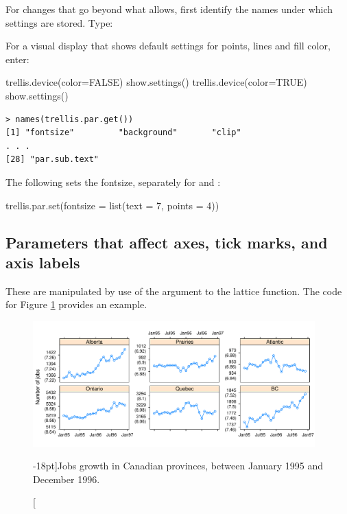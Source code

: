 For changes that go beyond what  allows, first
identify the names under which settings are stored. Type:
\begin{marginfigure}
For a visual display that shows default settings for
  points, lines and fill color, enter:
\begin{Schunk}
\begin{Sinput}
trellis.device(color=FALSE)
show.settings()
trellis.device(color=TRUE)
show.settings()
\end{Sinput}
\end{Schunk}
\end{marginfigure}
\begin{verbatim}
> names(trellis.par.get())
[1] "fontsize"         "background"       "clip"
. . .
[28] "par.sub.text"
\end{verbatim}

The following sets the fontsize, separately for  and
:\\[-6pt]

\noindent
\begin{minipage}[t]{1.175\textwidth}
\begin{Schunk}
\begin{Sinput}
trellis.par.set(fontsize = list(text = 7,
                                points = 4))
\end{Sinput}
\end{Schunk}
\end{minipage}

\subsection*{Parameters that affect axes, tick marks, and axis labels}
\label{ss:lattice-axis}

These are manipulated by use of the  argument to
the lattice function. The code for Figure \ref{fig:jobsplot}
provides an example.
\begin{figure}[h]
\begin{Schunk}


\centerline{\includegraphics[width=0.97\textwidth]{figs/07-jobsplot-1} }

\end{Schunk}
\caption[][-18pt]{Jobs growth in Canadian provinces, between January 1995
  and December 1996.}\label{fig:jobsplot}
\vspace*{18pt}
\end{figure}

